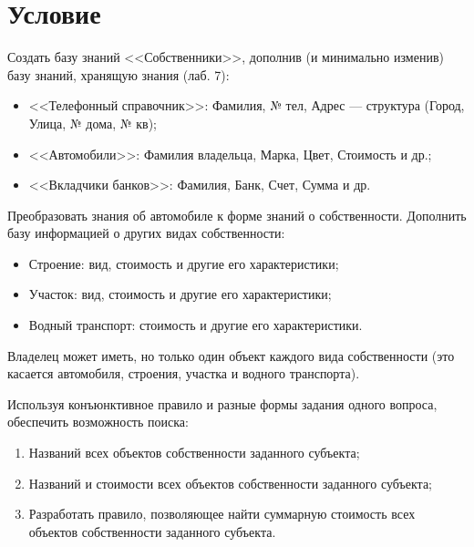 \section{Условие}
Создать базу знаний <<Собственники>>, дополнив (и минимально изменив) базу знаний, хранящую знания (лаб. 7):

\begin{itemize}
    \item <<Телефонный справочник>>: Фамилия, № тел, Адрес --- структура (Город, Улица, № дома, № кв);
    \item <<Автомобили>>: Фамилия владельца, Марка, Цвет, Стоимость и др.;
    \item <<Вкладчики банков>>: Фамилия, Банк, Счет, Сумма и др.
\end{itemize}

Преобразовать знания об автомобиле к форме знаний о собственности. 
Дополнить базу информацией о других видах собственности:
\begin{itemize}
    \item Строение: вид, стоимость и другие его характеристики;
    \item Участок: вид, стоимость и другие его характеристики;
    \item Водный транспорт: стоимость и другие его характеристики.
\end{itemize}

Владелец может иметь, но только один объект каждого вида собственности 
(это касается автомобиля, строения, участка и водного транспорта).

Используя конъюнктивное правило и разные формы задания одного вопроса, обеспечить возможность поиска:
\begin{enumerate}
    \item Названий всех объектов собственности заданного субъекта;
    \item Названий и стоимости всех объектов собственности заданного субъекта;
    \item Разработать правило, позволяющее найти суммарную стоимость всех объектов собственности заданного субъекта.
\end{enumerate}